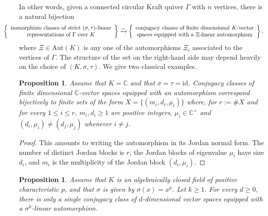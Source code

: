 \documentclass[12pt]{amsart}
\newtheorem{proposition}[theorem]{Proposition}
\theoremstyle{definition}
\newcommand{\<}{\langle}   %
\renewcommand{\>}{\rangle} %
\begin{document}
In other words, given a connected circular Kraft quiver $\Gamma$ with $n$ vertices, there is a natural bijection
\begin{equation*}
    \hspace*{-1cm}  
    \left\{\begin{array}{c}
    \text{isomorphism classes of strict } (\sigma,\tau)\text{-linear}\\
    \text{representations of } \Gamma \text{ over } K
    \end{array}\right\} \xrightarrow{\sim}
    \left\{\begin{array}{c}
    \text{conjugacy classes of finite dimensional } K\text{-vector}\\
    \text{spaces equipped with a } \Xi \text{-linear automorphism}
    \end{array}\right\},
\end{equation*}
where $\Xi \in \mathrm{Aut}(K)$ is any one of the automorphisms $\Xi_i$ associated to the vertices of $\Gamma$. The structure of the set on the right-hand side may depend heavily on the choice of $(K,\sigma,\tau)$. We give two classical examples. 

\begin{proposition}\label{PropositionJordanForm}
    Assume that $K = \mathbb C$ and that $\sigma = \tau = \mathrm{id}$. Conjugacy classes of finite dimensional $\mathbb C$-vector spaces equipped with an automorphism correspond bijectively to finite sets of the form $X = \{(m_i,d_i,\mu_i)\}$ where, for $r := \#X$ and for every $1 \leq i \leq r$, $m_i,d_i \geq 1$ are positive integers, $\mu_i \in \mathbb C^{\times}$ and $(d_i,\mu_i) \not = (d_j,\mu_j)$ whenever $i\not = j$.
\end{proposition}

\begin{proof}
    This amounts to writing the automorphism in its Jordan normal form. The number of distinct Jordan blocks is $r$, the Jordan blocks of eigenvalue $\mu_i$ have size $d_i$, and $m_i$ is the multiplicity of the Jordan block $(d_i,\mu_i)$. 
\end{proof}

\begin{proposition}\label{LangSteinbergTheorem}
    Assume that $K$ is an algebraically closed field of positive characteristic $p$, and that $\sigma$ is given by $\sigma(x) = x^p$. Let $k \geq 1$. For every $d\geq 0$, there is only a single conjugacy class of $d$-dimensional vector spaces equipped with a $\sigma^k$-linear automorphism.
\end{proposition}
\end{document}
